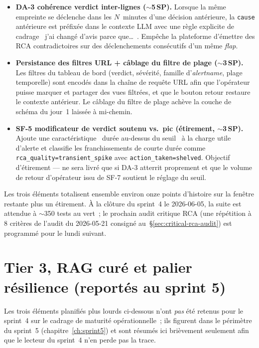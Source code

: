 \documentclass[11pt,a4paper,oneside]{report}
\begin{document}
\begin{itemize}
  \item \textbf{DA-3 cohérence verdict inter-lignes
        ($\sim$5\,SP).} Lorsque la même empreinte se déclenche
        dans les $N$~minutes d'une décision antérieure, la
        \texttt{cause} antérieure est préfixée dans le contexte
        LLM avec une règle explicite de cadrage \og~j'ai changé
        d'avis parce que\ldots~\fg{}. Empêche la plateforme
        d'émettre des RCA contradictoires sur des déclenchements
        consécutifs d'un même \emph{flap}.
  \item \textbf{Persistance des filtres URL + câblage du filtre
        de plage ($\sim$3\,SP).} Les filtres du tableau de bord
        (verdict, sévérité, famille d'\emph{alertname}, plage
        temporelle) sont encodés dans la chaîne de requête URL
        afin que l'opérateur puisse marquer et partager des vues
        filtrées, et que le bouton retour restaure le contexte
        antérieur. Le câblage du filtre de plage achève la couche
        de schéma du jour~1 laissée à mi-chemin.
  \item \textbf{SF-5 modificateur de verdict soutenu vs.\ pic
        (étirement, $\sim$3\,SP).} Ajoute une caractéristique
        \og~durée au-dessus du seuil~\fg{} à la charge utile
        d'alerte et classifie les franchissements de courte durée
        comme \texttt{rca\_quality=transient\_spike} avec
        \texttt{action\_taken=shelved}. Objectif d'étirement ---
        ne sera livré que si DA-3 atterrit proprement et que le
        volume de retour d'opérateur issu de SF-7 soutient le
        réglage du seuil.
\end{itemize}

Les trois éléments totalisent ensemble environ onze points
d'histoire sur la fenêtre restante plus un étirement. À la
clôture du sprint~4 le 2026-06-05, la suite est attendue à
$\sim$350 tests au vert~; le prochain audit critique RCA (une
répétition à 8 critères de l'audit du 2026-05-21 consigné
au~\S\ref{sec:critical-rca-audit}) est programmé pour le lundi
suivant.

\section{Tier 3, RAG curé et palier résilience (reportés au sprint 5)}

Les trois éléments planifiés plus lourds ci-dessous n'ont
\emph{pas} été retenus pour le sprint~4 sur le cadrage de maturité
opérationnelle~; ils figurent dans le périmètre du sprint~5
(chapitre~\ref{ch:sprint5}) et sont résumés ici brièvement
seulement afin que le lecteur du sprint~4 n'en perde pas la trace.
\end{document}

